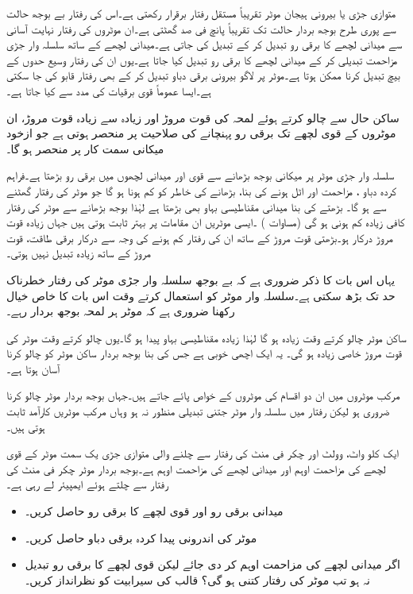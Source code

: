 متوازی جڑی یا بیرونی ہیجان موٹر تقریباً  مستقل رفتار  برقرار رکھتی ہے۔اس کی رفتار بے بوجھ حالت سے پوری طرح بوجھ بردار حالت تک تقریباً  پانچ فی صد گھٹتی ہے۔ان موٹروں کی رفتار نہایت آسانی سے میدانی لچھے کا برقی رو تبدیل کر کے تبدیل کی جاتی ہے۔میدانی لچھے کے ساتھ سلسلہ وار جڑی مزاحمت تبدیلی کر کے میدانی لچھے کا برقی رو تبدیل کیا جاتا ہے۔یوں ان کی رفتار  وسیع حدوں کے بیچ تبدیل کرنا ممکن ہوتا ہے۔موٹر پر لاگو بیرونی برقی دباو تبدیل کر کے بھی رفتار قابو کی جا سکتی ہے۔ایسا عموماً قوی برقیات کی مدد سے کیا جاتا ہے۔

ساکن حال سے چالو کرتے ہوئے لمحہ کی قوت مروڑ اور  زیادہ سے زیادہ قوت مروڑ، ان موٹروں کے  قوی لچھے تک برقی رو پہنچانے کی صلاحیت پر منحصر ہوتی ہے جو ازخود میکانی سمت کار پر منحصر ہو گا۔

سلسلہ وار جڑی موٹر پر میکانی بوجھ بڑھانے سے  قوی اور میدانی لچھوں میں برقی رو  بڑھتا ہے۔فراہم کردہ دباو  ، مزاحمت   اور  اٹل ہونے کی بنا،  بڑھانے کی خاطر   کو کم ہونا ہو گا  جو موٹر کی رفتار گھٹنے سے ہو گا۔ بڑھتے  کی بنا میدانی مقناطیسی بہاو  بھی بڑھتا ہے لہٰذا  بوجھ بڑھانے سے  موٹر کی رفتار کافی زیادہ کم ہونی ہو گی (مساوات ) ۔ایسی موٹریں ان مقامات پر بہتر ثابت ہوتی ہیں جہاں زیادہ قوت مروڑ درکار ہو۔بڑھتی قوت مروڑ کے ساتھ ان کی رفتار کم ہونے کی وجہ سے  درکار برقی طاقت، قوت مروڑ کے ساتھ زیادہ تبدیل نہیں ہوتی۔

یہاں اس بات کا ذکر ضروری ہے کہ بے بوجھ سلسلہ وار جڑی موٹر کی رفتار خطرناک حد تک بڑھ سکتی ہے۔سلسلہ وار موٹر کو استعمال کرتے وقت اس بات کا خاص خیال رکھنا ضروری ہے کہ موٹر ہر لمحہ بوجھ بردار رہے۔

ساکن  موٹر چالو کرتے وقت     زیادہ ہو گا لہٰذا زیادہ  مقناطیسی بہاو پیدا ہو گا۔یوں چالو کرتے وقت موٹر کی قوت مروڑ خاصی زیادہ ہو گی۔ یہ ایک اچھی خوبی ہے جس کی بنا بوجھ بردار ساکن موٹر کو چالو کرنا آسان ہوتا ہے۔

مرکب موٹروں میں ان دو اقسام کی موٹروں کے خواص پائے جاتے ہیں۔جہاں بوجھ بردار موٹر چالو کرنا ضروری ہو لیکن رفتار میں سلسلہ وار موٹر جتنی تبدیلی منظور نہ ہو وہاں مرکب موٹریں کارآمد ثابت ہوتی ہیں۔

ایک   کلو واٹ،  وولٹ اور  چکر فی منٹ کی رفتار سے چلنے والی متوازی جڑی یک سمت  موٹر کے قوی لچھے کی مزاحمت  اوہم اور میدانی لچھے کی مزاحمت   اوہم ہے۔بوجھ بردار موٹر    چکر فی منٹ کی رفتار سے چلتے ہوئے   ایمپیئر لے رہی ہے۔ 
\begin{itemize}
\item
میدانی برقی رو اور قوی لچھے کا برقی رو حاصل کریں۔
\item
موٹر کی اندرونی پیدا کردہ برقی دباو حاصل کریں۔
\item
اگر میدانی لچھے کی مزاحمت  اوہم کر دی جائے  لیکن قوی لچھے کا برقی رو تبدیل نہ ہو  تب موٹر کی رفتار کتنی ہو گی؟ قالب کی سیرابیت کو نظرانداز کریں۔
\end{itemize}

